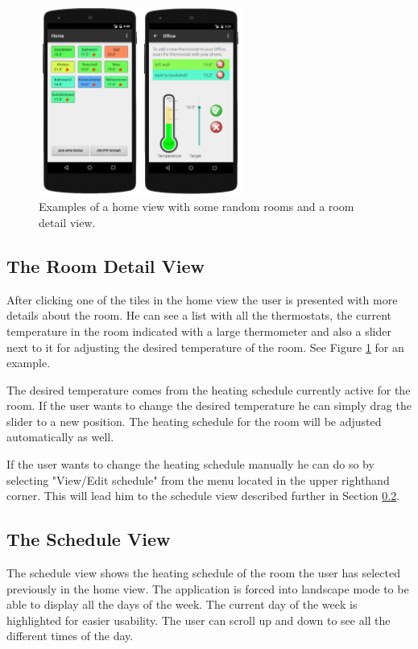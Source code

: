 \begin{figure}
	\begin{center}
		\includegraphics[width=0.6\textwidth]{images/home_view.png}
	\end{center}
	\caption{Examples of a home view with some random rooms and a room detail view.}
	\label{fig:home_view}
\end{figure}

\subsection{The Room Detail View}
\label{sec:detail_view}
After clicking one of the tiles in the home view the user is presented with more details about the room. He can see a list with all the thermostats, the current temperature in the room indicated with a large thermometer and also a slider next to it for adjusting the desired temperature of the room. See Figure \ref{fig:home_view} for an example.

The desired temperature comes from the heating schedule currently active for the room. If the user wants to change the desired temperature he can simply drag the slider to a new position. The heating schedule for the room will be adjusted automatically as well.

If the user wants to change the heating schedule manually he can do so by selecting "View/Edit schedule" from the menu located in the upper righthand corner. This will lead him to the schedule view described further in Section \ref{sec:schedule_view}. 

\subsection{The Schedule View}
\label{sec:schedule_view}
\label{sec:last_view}
The schedule view shows the heating schedule of the room the user has selected previously in the home view. The application is forced into landscape mode to be able to display all the days of the week. The current day of the week is highlighted for easier usability. The user can scroll up and down to see all the different times of the day. 

